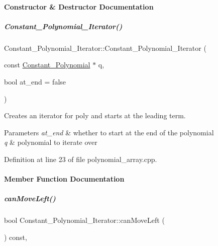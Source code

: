 \paragraph{Constructor \& Destructor Documentation}
\mbox{\label{group___iterator_group_ab2e59cf23f80448b3b2be7573181c1b7}} 
\subparagraph{\texorpdfstring{Constant\+\_\+\+Polynomial\+\_\+\+Iterator()}{Constant\_Polynomial\_Iterator()}}
{\footnotesize\ttfamily Constant\+\_\+\+Polynomial\+\_\+\+Iterator\+::\+Constant\+\_\+\+Polynomial\+\_\+\+Iterator (\begin{DoxyParamCaption}\item[{const \hyperlink{group__polygroup_class_constant___polynomial}{Constant\+\_\+\+Polynomial} $\ast$}]{q,  }\item[{bool}]{at\+\_\+end = {\ttfamily false} }\end{DoxyParamCaption})}



Creates an iterator for {\ttfamily poly} and starts at the leading term. 


\begin{DoxyParams}{Parameters}
{\em at\+\_\+end} & whether to start at the end of the polynomial \\
\hline
{\em q} & polynomial to iterate over \\
\hline
\end{DoxyParams}


Definition at line 23 of file polynomial\+\_\+array.\+cpp.



\paragraph{Member Function Documentation}
\mbox{\label{group___iterator_group_ade22e36aead8eca568dbd99c6ab73cc2}} 
\subparagraph{\texorpdfstring{can\+Move\+Left()}{canMoveLeft()}}
{\footnotesize\ttfamily bool Constant\+\_\+\+Polynomial\+\_\+\+Iterator\+::can\+Move\+Left (\begin{DoxyParamCaption}{ }\end{DoxyParamCaption}) const\hspace{0.3cm}{\ttfamily [override]}, {\ttfamily [virtual]}}

